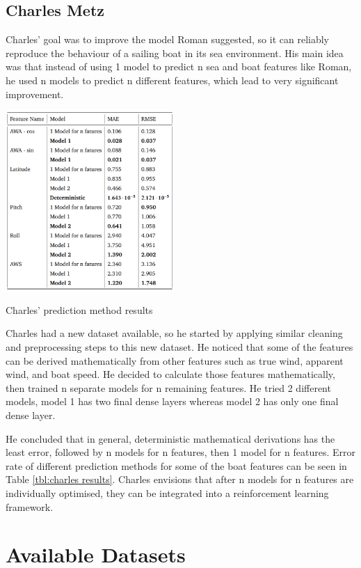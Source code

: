 \documentclass[12pt,twoside]{report}
\begin{document}
\subsection{Charles Metz}
Charles' goal was to improve the model Roman suggested, so it can reliably reproduce the behaviour of a sailing boat in its sea environment. His main idea was that instead of using 1 model to predict n sea and boat features like Roman, he used n models to predict n different features, which lead to very significant improvement. \cite{charles}

\begin{table}
\centering
\includegraphics[width=0.48\textwidth]{figures/charles results.png}
\caption{Charles' prediction method results}
\label{tbl:charles results}
\end{table}

Charles had a new dataset available, so he started by applying similar cleaning and preprocessing steps to this new dataset. He noticed that some of the features can be derived mathematically from other features such as true wind, apparent wind, and boat speed. He decided to calculate those features mathematically, then trained n separate models for n remaining features. He tried 2 different models, model 1 has two final dense layers whereas model 2 has only one final dense layer.

He concluded that in general, deterministic mathematical derivations has the least error, followed by n models for n features, then 1 model for n features. Error rate of different prediction methods for some of the boat features can be seen in Table \ref{tbl:charles results}. Charles envisions that after n models for n features are individually optimised, they can be integrated into a reinforcement learning framework.



\section{Available Datasets}
\end{document}
